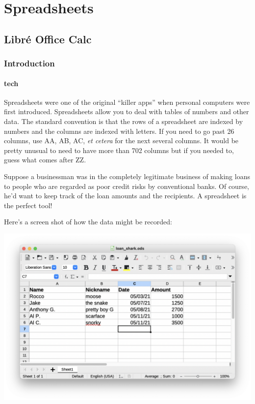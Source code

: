  
\chapter{Spreadsheets}


\section{Libr\'{e} Office Calc}
\label{sec:calc}

\subsection{Introduction}

\subsubsection{tech}

Spreadsheets were one of the original ``killer apps'' when personal computers were first introduced.  Spreadsheets allow you to deal with tables of numbers and other data.  The standard convention is that the rows of a spreadsheet are indexed by numbers and the columns are indexed with letters.  If you need to go past 26 columns, use AA, AB, AC, {\em et cetera} for the next several columns.  It would be pretty unusual to need to have more than 702 columns but if you needed to, guess what comes after ZZ.

Suppose a businessman was in the completely legitimate business of making loans to people who are regarded as poor credit risks by conventional banks.  Of course, he'd want to keep track of the loan amounts and the recipients.  A spreadsheet is the perfect tool!

Here's a screen shot of how the data might be recorded:

\centerline{\includegraphics[scale=.5]{spread/loans.png}}

